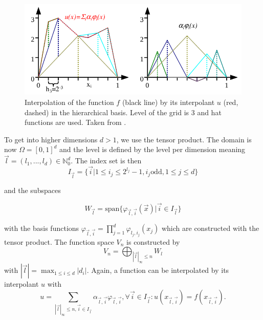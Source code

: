 \begin{figure}[htbp!]
	\centering
	\includegraphics[scale=0.5]{figures/weighted_sum_hierarchical.png}
	\caption{ Interpolation of the function $ f $ (black line) by its interpolant $ u $ (red, dashed) in the hierarchical basis. Level of the grid is 3 and hat functions are used. Taken from \cite{pfluger2010spatially}.}
	\label{fig:weighted_sum_hierarchical}
\end{figure}

To get into higher dimensions $ d > 1 $, we use the tensor product. The domain is now $ \Omega = [0,1]^d $ and the level is defined by the level per dimension meaning $ \vec{l} = (l_1, ..., l_d) \in \mathbb{N}_0^d $. The index set is then
\begin{equation}
	I_{\vec{l}} = \{ \vec{i} | 1 \le i_j \le 2^{l_j} -1 , i_j \text{odd}, 1 \le j \le d \}
\end{equation}

and the subspaces 

\begin{equation}
	W_{\vec{l}} = \text{span}\{ \varphi_{\vec{l},\vec{i}}( \vec{x} ) | \vec{i} \in I_{\vec{l}}\}
\end{equation}

with the basis functions $ \varphi_{\vec{l},\vec{i}} = \prod_{j=1}^{d} \varphi_{l_j,i_j}(x_j) $ which are constructed with the tensor product. The function space $ V_n $ is constructed by
\begin{equation}
	V_n = \bigoplus_{|\vec{l}|_\infty \le n} W_l
\end{equation}
with $ |\vec{l}| = \max_{1 \le i \le d} |d_i| $. Again, a function can be interpolated by its interpolant $ u $ with
\begin{equation}
	u = \sum_{|\vec{l}|_\infty \le n, \vec{i} \in I_{\vec{l}}}\alpha_{\vec{l},\vec{i}} \varphi_{\vec{l},\vec{i}}, \forall \vec{i} \in I_{\vec{l}}: u(x_{\vec{l},\vec{i}}) = f(x_{\vec{l},\vec{i}}).
\end{equation}

